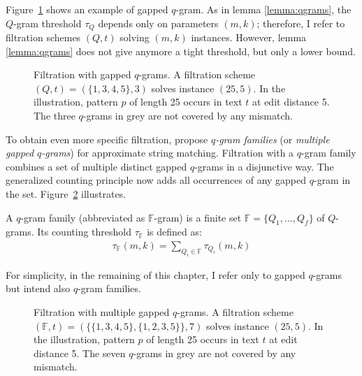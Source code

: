 Figure~\ref{fig:qgrams-gapped} shows an example of gapped $q$-gram.
As in lemma \ref{lemma:qgrams}, the $Q$-gram threshold $\tau_Q$ depends only on parameters $(m,k)$;
therefore, I refer to filtration schemes $(Q,t)$ solving $(m,k)$ instances.
However, lemma \ref{lemma:qgrams} does not give anymore a tight threshold, but only a lower bound.

\begin{figure}[t]
\begin{center}
\caption[Filtration with gapped $q$-grams]{Filtration with gapped $q$-grams. A filtration scheme $(Q,t) = (\{1, 3, 4, 5\},3)$ solves instance $(25,5)$. In the illustration, pattern $p$ of length 25 occurs in text $t$ at edit distance 5. The three $q$-grams in grey are not covered by any mismatch.}
\label{fig:qgrams-gapped}

\end{center}
\end{figure}

To obtain even more specific filtration, \cite{Kucherov2005} propose \emph{$q$-gram families} (or \emph{multiple gapped $q$-grams}) for approximate string matching.
Filtration with a $q$-gram family combines a set of multiple distinct gapped $q$-grams in a disjunctive way.
The generalized counting principle now adds all occurrences of any gapped $q$-gram in the set.
Figure~\ref{fig:qgrams-multiple} illustrates.
\begin{definition}
A $q$-gram family (abbreviated as $\mathbb{F}$-gram) is a finite set $\mathbb{F} = \{ Q_1, \dots, Q_f \}$ of $Q$-grams.
Its counting threshold $\tau_{\mathbb{F}}$ is defined as:
\begin{eqnarray}
\tau_{\mathbb{F}}(m,k) = \sum_{Q_i \in \mathbb{F}}{\tau_{Q_i}(m,k)}
\end{eqnarray}
\end{definition}
For simplicity, in the remaining of this chapter, I refer only to gapped $q$-grams but intend also $q$-gram families.

\begin{figure}[b]
\begin{center}
\caption[Filtration with multiple gapped $q$-grams]{Filtration with multiple gapped $q$-grams. A filtration scheme $(\mathbb{F},t) = (\{ \{1, 3, 4, 5\}, \{1, 2, 3, 5\} \},7)$ solves instance $(25,5)$. In the illustration, pattern $p$ of length 25 occurs in text $t$ at edit distance 5. The seven $q$-grams in grey are not covered by any mismatch.}
\label{fig:qgrams-multiple}

\end{center}
\end{figure}

